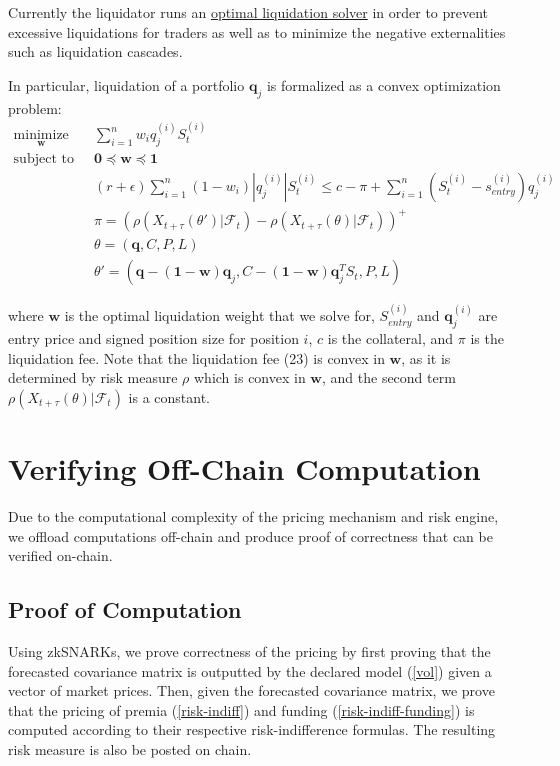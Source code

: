 \documentclass{article}
\begin{document}
Currently the liquidator runs an \href{https://research.vest.xyz/t/optimal-liquidations-via-convex-optimization/201}{optimal liquidation solver} in order to prevent excessive liquidations for traders as well as to minimize the negative externalities such as liquidation cascades. 

In particular, liquidation of a portfolio $\mathbf{q}_j$ is formalized as a convex optimization problem: 
\begin{align} 
    \underset{\mathbf{w}}{\text{minimize}} \quad & \sum_{i=1}^nw_iq_j^{(i)}S_{t}^{(i)} \\ \text{subject to} \quad &\mathbf{0} \preceq \mathbf{w} \preceq \mathbf{1} \\ 
    & (r + \epsilon)\sum_{i=1}^n(1-w_i)|q_j^{(i)}|S_{t}^{(i)}  \leq c - \pi + \sum_{i=1}^n(S_{t}^{(i)}-s_{entry}^{(i)})q_j^{(i)} \\
    &\pi = (\rho(X_{t+\tau}(\theta')|\mathcal{F}_t)-\rho(X_{t+\tau}(\theta)|\mathcal{F}_t))^+\\
    &\theta = (\mathbf{q}, C, P, L) \\
    &\theta' = (\mathbf{q}-(\mathbf{1}-\mathbf{w})\mathbf{q}_j, C-(\mathbf{1}-\mathbf{w})\mathbf{q}_j^TS_t, P, L)
\end{align}

where $\mathbf{w}$ is the optimal liquidation weight that we solve for, $S_{entry}^{(i)}$ and $\mathbf{q}_j^{(i)}$ are entry price and signed position size for position $i$, $c$ is the collateral, and $\pi$ is the liquidation fee. Note that the liquidation fee (23) is convex in $\mathbf{w}$, as it is determined by risk measure $\rho$ which is convex in $\mathbf{w}$, and the second term $\rho(X_{t+\tau}(\theta)|\mathcal{F}_t)$ is a constant.

\section{Verifying Off-Chain Computation}

Due to the computational complexity of the pricing mechanism and risk engine, we offload computations off-chain and produce proof of correctness that can be verified on-chain. 

\subsection{Proof of Computation}

Using zkSNARKs, we prove correctness of the pricing by first proving that the forecasted covariance matrix is outputted by the declared model (\ref{vol}) given a vector of market prices. Then, given the forecasted covariance matrix, we prove that the pricing of premia (\ref{risk-indiff}) and funding (\ref{risk-indiff-funding}) is computed according to their respective risk-indifference formulas. The resulting risk measure is also be posted on chain.
\end{document}
